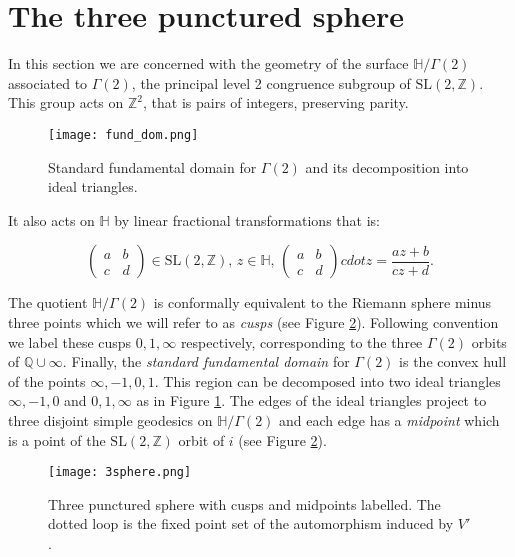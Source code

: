 \documentclass[12pt,a4paper]{amsart}
\def\HH{\mathbb{H}}
\def\xx{\HH/g2}
\def\ZZ{\mathbb{Z}}
\def\QQ{\mathbb{Q}}
\def\sl2{\mathrm{SL}(2, \ZZ)}
\def\g2{\Gamma(2)}
\def\xx{\HH/\g2}
\begin{document}
\section{The three punctured sphere}

In this section we are concerned with the geometry of the surface
$\xx$ associated to $\g2$, the principal level 2 congruence subgroup
of $\sl2$. This group acts on $\ZZ^2$, that is pairs of integers,
preserving parity.

 \begin{figure}[hb]
\begin{center}
\texttt{[image: fund\_dom.png]} 
\end{center}
\caption{Standard fundamental domain for $\g2$ and its decomposition into ideal triangles.}
\label{fund}
\end{figure}


It also acts on $\HH$ by linear fractional transformations that is:

$$\begin{pmatrix}
a & b \\
c & d
\end{pmatrix} \in \sl2,\, z\in \HH,\, 
\begin{pmatrix}
a & b \\
c & d
\end{pmatrix}cdot z = \frac{az + b}{cz + d}.
$$

The quotient $\xx$ is conformally equivalent to the Riemann  sphere
minus three points which we will refer to as \textit{cusps} (see
Figure \ref{3punctured}). Following  convention we label these cusps
$0,1,\infty$ respectively, corresponding to the three $\g2$ orbits
of $\QQ \cup \infty$. Finally, the \textit{standard fundamental
domain}  for $\g2$ is the convex hull of the points $\infty, -1, 0 ,
1$. This region can be decomposed into two ideal triangles $\infty,
-1, 0 $ and $ 0 , 1,\infty$ as in Figure \ref{fund}. The edges of
the ideal triangles project to three disjoint simple geodesics on
$\xx$ and each edge has a \textit{midpoint} which is a point of the
$\sl2$ orbit of $i$ (see Figure \ref{3punctured}).




 \begin{figure}[hb]
\begin{center}
\texttt{[image: 3sphere.png]} 
\end{center}
\caption{Three punctured sphere with cusps and midpoints labelled.
The dotted loop is the fixed point set of the automorphism induced by $V'$.}
 \label{3punctured}
\end{figure}
\end{document}
